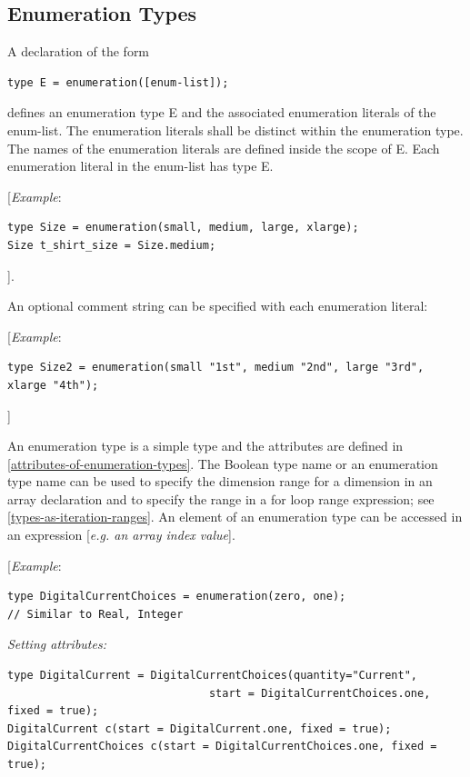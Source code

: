 \documentclass[10pt,a4paper]{report}
\def\doublelabel#1{\label{#1}}
\begin{document}
\subsection{Enumeration Types}\doublelabel{enumeration-types}

A declaration of the form
\begin{lstlisting}[language=Modelica]
type E = enumeration([enum-list]);
\end{lstlisting}

defines an enumeration type E and the associated enumeration literals of
the enum-list. The enumeration literals shall be distinct within the
enumeration type. The names of the enumeration literals are defined
inside the scope of E. Each enumeration literal in the enum-list has
type E.

{[}\emph{Example}:
\begin{lstlisting}[language=Modelica]
type Size = enumeration(small, medium, large, xlarge);
Size t_shirt_size = Size.medium;
\end{lstlisting}

{]}.

An optional comment string can be specified with each enumeration
literal:

{[}\emph{Example}:
\begin{lstlisting}[language=Modelica]
type Size2 = enumeration(small "1st", medium "2nd", large "3rd", xlarge "4th");
\end{lstlisting}

{]}

An enumeration type is a simple type and the attributes are defined in
\ref{attributes-of-enumeration-types}. The Boolean type name or an enumeration type name can
be used to specify the dimension range for a dimension in an array
declaration and to specify the range in a for loop range expression; see
\ref{types-as-iteration-ranges}. An element of an enumeration type can be accessed in
an expression {[}\emph{e.g. an array index value}{]}.

{[}\emph{Example}:
\begin{lstlisting}[language=Modelica]
type DigitalCurrentChoices = enumeration(zero, one);
// Similar to Real, Integer
\end{lstlisting}

\emph{Setting attributes: }
\begin{lstlisting}[language=Modelica]
type DigitalCurrent = DigitalCurrentChoices(quantity="Current",
                               start = DigitalCurrentChoices.one, fixed = true);
DigitalCurrent c(start = DigitalCurrent.one, fixed = true);
DigitalCurrentChoices c(start = DigitalCurrentChoices.one, fixed = true);
\end{lstlisting}
\end{document}
